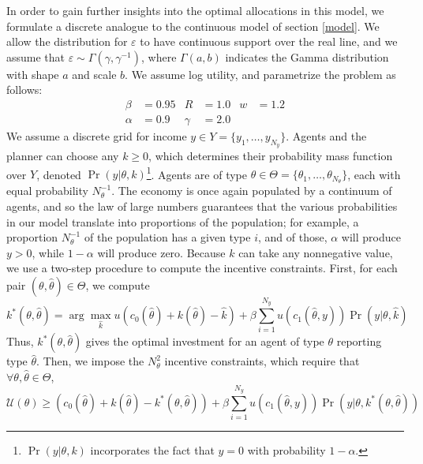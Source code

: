 \documentclass[11pt]{article}
\newcommand{\inv}[1]{#1^{-1}}
\newcommand{\U}{\mathcal{U}}
\begin{document}
In order to gain further insights into the optimal allocations in this model, we formulate a discrete analogue to the continuous model of section \ref{model}. We allow the distribution for \( \varepsilon \) to have continuous support over the real line, and we assume that \( \varepsilon\sim\Gamma(\gamma, \inv{\gamma}) \), where \( \Gamma(a,b) \) indicates the Gamma distribution with shape \( a \) and scale \( b \). We assume log utility, and parametrize the problem as follows:
\begin{align*}
    \beta &= 0.95 & R &= 1.0 & w &= 1.2 \\
    \alpha &= 0.9 & \gamma &= 2.0
\end{align*}
We assume a discrete grid for income \( y\in Y=\{y_1,\dots,y_{N_y}\} \). Agents and the planner can choose any \( k\ge 0 \), which determines their probability mass function over \( Y \), denoted \( \Pr\left( y|\theta,k \right) \)\footnote{\( \Pr\left( y|\theta,k \right) \) incorporates the fact that \( y=0 \) with probability \( 1-\alpha \).}. Agents are of type \( \theta\in\Theta=\{\theta_1,\dots,\theta_{N_\theta}\} \), each with equal probability \( N_\theta^{-1} \). The economy is once again populated by a continuum of agents, and so the law of large numbers guarantees that the various probabilities in our model translate into proportions of the population; for example, a proportion \( N_\theta^{-1} \) of the population has a given type \( i \), and of those, \( \alpha \) will produce \( y>0 \), while \( 1-\alpha \) will produce zero. Because \( k \) can take any nonnegative value, we use a two-step procedure to compute the incentive constraints. First, for each pair \( \left( \theta,\hat{\theta } \right)\in\Theta \), we compute 
\[k^*(\theta,\hat{\theta}) = \arg\max_{\hat{k}}u\left( c_0\left( \hat{\theta} \right) + k\left( \hat{\theta} \right)-\hat{k} \right) + \beta \sum_{i=1}^{N_y}u\left( c_1\left( \hat{\theta},y \right) \right)\Pr\left(y|\theta,\hat{k} \right)\]
Thus, \( k^*\left( \theta,\hat{\theta} \right) \) gives the optimal investment for an agent of type \( \theta \) reporting type \( \hat{\theta} \). Then, we impose the \( N_\theta^2 \) incentive constraints, which require that \( \forall\theta, \hat{\theta}\in\Theta \),
\begin{equation}
    \U(\theta)\geq \left( c_0\left( \hat{\theta} \right) + k\left( \hat{\theta} \right)-k^*\left( \theta,\hat{\theta} \right) \right) + \beta \sum_{i=1}^{N_y}u\left( c_1\left( \hat{\theta},y \right) \right)\Pr\left(y|\theta,k^*\left( \theta,\hat{\theta} \right)\right)
\end{equation}
\end{document}
